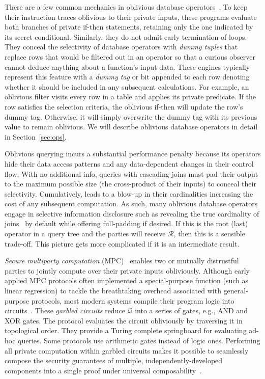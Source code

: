 \documentclass[11pt]{article}
\newcommand{\answer}{$\mathcal{R}$\xspace}
\newcommand{\query}{$\mathcal{Q}$\xspace}
\begin{document}
There are a few common mechanics in oblivious database operators~\cite{bater2017smcql, zheng2017opaque,volgushev2019conclave,liagouris2023secrecy,ant2024scql}.  To keep their instruction traces oblivious to their private inputs, these programs evaluate both branches of private if-then statements, retaining only the one indicated by its secret conditional.  Similarly, they do not admit early termination of loops.  They conceal the selectivity of database operators with {\em dummy tuples} that replace rows that would be filtered out in an operator so that a curious observer cannot deduce anything  about a function's input data.  These engines typically represent this feature with a {\em dummy tag} or bit appended to each row  denoting whether it should be included in any subsequent calculations.  For example, an oblivious filter visits every row in a table and  applies its private predicate.   If the row satisfies the selection criteria, the oblivious if-then will update the row's dummy tag.  Otherwise,  it will simply overwrite the dummy tag with its previous value to remain oblivious.  We will describe oblivious database operators in detail in Section~\ref{sec:ops}.


Oblivious querying incurs a substantial performance penalty because its operators hide their data access patterns and any data-dependent changes in their control flow. With no additional info, queries with cascading joins must pad their output to the maximum possible size (the cross-product of their inputs) to conceal their selectivity.  Cumulatively, leads to a blow-up in their cardinalities increasing the cost of any subsequent computation.   As such, many oblivious database operators engage in selective information disclosure such as revealing the true cardinality of joins~\cite{krastnikov13efficient, zheng2017opaque} by default while offering full-padding  if desired.  If this is the root (last) operator in a query tree and the parties will receive \answer, then this is a sensible trade-off.  This picture gets more complicated if it is an intermediate result.


{\em Secure multiparty computation} (MPC)~\cite{goldreich1987mpc,lindell2021mpc} enables two or mutually distrustful parties to jointly compute over their private inputs obliviously.  Although early applied MPC protocols often implemented a special-purpose function (such as linear regression) to tackle the breathtaking overhead associated with general-purpose protocols, most modern systems compile their program logic into circuits~\cite{marcella2019sokmpccompilers}.  These {\em garbled circuits} reduce \query  into a series of gates, e.g., AND and XOR gates.  The protocol evaluates the circuit obliviously by traversing it in topological order.  They provide a Turing complete springboard for evaluating ad-hoc queries.   Some protocols use arithmetic gates instead of logic ones.   Performing all private computation within garbled circuits makes it possible to seamlessly compose the security guarantees of multiple, independently-developed components into a single proof under universal composability~\cite{Canetti2001}. 
\end{document}
